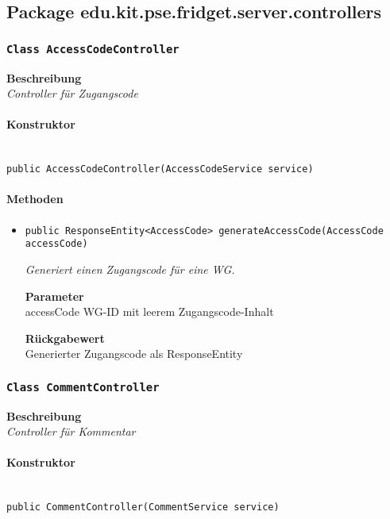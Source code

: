 

%
     \subsection{Package edu.kit.pse.fridget.server.controllers}
     \subsubsection{\texttt{Class AccessCodeController}}
     \textbf{Beschreibung} \\
     \textit{Controller für Zugangscode}
     \paragraph*{Konstruktor}\mbox{} \\
     \texttt{public AccessCodeController(AccessCodeService service)} \\
     \paragraph*{Methoden}
     \begin{itemize}
     	\item{\texttt{public ResponseEntity<AccessCode> generateAccessCode(AccessCode accessCode)}}
     	
     	\textit{Generiert einen Zugangscode für eine WG.}
     	
     	\textbf{Parameter} \\
     	accessCode WG-ID mit leerem Zugangscode-Inhalt
     	
     	\textbf{Rückgabewert} \\
     	Generierter Zugangscode als ResponseEntity
     \end{itemize}
     \subsubsection{\texttt{Class CommentController}}
     \textbf{Beschreibung} \\
     \textit{Controller für Kommentar}
     \paragraph*{Konstruktor}\mbox{} \\
     \texttt{public CommentController(CommentService service)} \\
